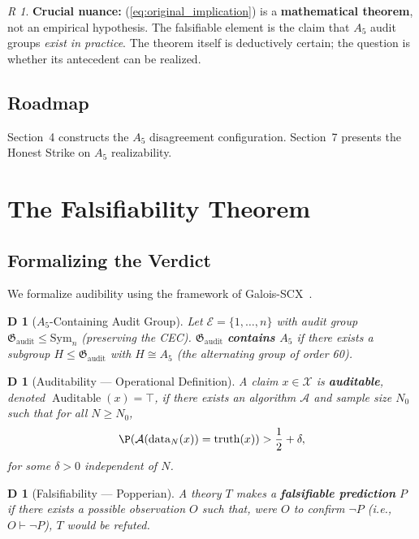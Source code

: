 \documentclass[12pt,a4paper]{article}
\newtheorem{definition}[theorem]Definition
\theoremstyle{remark}
\newtheorem{remark}[theorem]Remark
\newcommand{\Sym}{\mathrm{Sym}}
\newcommand{\AuditGrp}{\mathfrak{G}_{\mathrm{audit}}}
\newcommand{\ExpertSet}{\mathcal{E}}
\newcommand{\ClaimSpace}{\mathcal{X}}
\DeclareMathOperator{\Auditable}{Auditable}
\begin{document}
\begin{remark}
\textbf{Crucial nuance:} (\ref{eq:original_implication}) is a \textbf{mathematical theorem}, not an empirical hypothesis. The falsifiable element is the claim that \(A_5\) audit groups \textit{exist in practice}. The theorem itself is deductively certain; the question is whether its antecedent can be realized.
\end{remark}

\subsection{Roadmap}
Section~4 constructs the \(A_5\) disagreement configuration. Section~7 presents the Honest Strike on \(A_5\) realizability.
\section{The Falsifiability Theorem}
\subsection{Formalizing the Verdict}
We formalize audibility using the framework of Galois-SCX~\cite{scx2026galois}.

\begin{definition}[\(A_5\)-Containing Audit Group]
Let \(\ExpertSet = \{1,\ldots,n\}\) with audit group \(\AuditGrp \leq \Sym_n\) (preserving the CEC). \(\AuditGrp\) \textbf{contains \(A_5\)} if there exists a subgroup \(H \leq \AuditGrp\) with \(H \cong A_5\) (the alternating group of order 60).
\end{definition}

\begin{definition}[Auditability --- Operational Definition]
A claim \(x \in \ClaimSpace\) is \textbf{auditable}, denoted \(\Auditable(x) = \top\), if there exists an algorithm \(\mathcal{A}\) and sample size \(N_0\) such that for all \(N \geq N_0\),
\begin{equation}
    \P(\mathcal{A}(\text{data}_N(x)) = \text{truth}(x)) > \frac{1}{2} + \delta,
\end{equation}
for some \(\delta > 0\) independent of \(N\).
\end{definition}

\begin{definition}[Falsifiability --- Popperian]
A theory \(T\) makes a \textbf{falsifiable prediction} \(P\) if there exists a possible observation \(O\) such that, were \(O\) to confirm \(\neg P\) (i.e., \(O \vdash \neg P\)), \(T\) would be refuted.
\end{definition}
\end{document}

